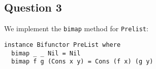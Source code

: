 \subsection*{Question 3}

We implement the \lstinline{bimap} method for \lstinline{Prelist}:

\begin{lstlisting}
instance Bifunctor PreList where
  bimap _ _ Nil = Nil
  bimap f g (Cons x y) = Cons (f x) (g y)
\end{lstlisting}
